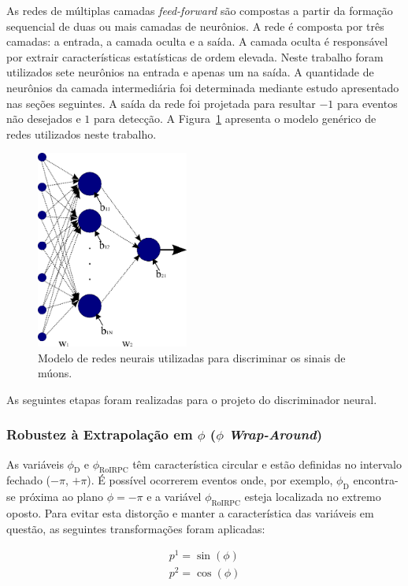 As redes de múltiplas camadas \emph{feed-forward} são compostas a partir da
formação sequencial de duas ou mais camadas de neurônios. A rede é composta por
três camadas: a entrada, a camada oculta e a saída. A camada oculta é
responsável por extrair características estatísticas de ordem elevada. Neste
trabalho foram utilizados sete neurônios na entrada e apenas um na saída. A
quantidade de neurônios da camada intermediária foi determinada mediante estudo
apresentado nas seções seguintes. A saída da rede foi projetada para resultar
$-1$ para eventos não desejados e $1$ para detecção. A Figura~\ref{fig:nnArch}
apresenta o modelo genérico de redes utilizados neste trabalho.

\begin{figure}[htbp!]
    \centering
    \includegraphics[height=6.5cm]{images/nnschema.png}
    \caption{Modelo de redes neurais utilizadas para discriminar os sinais de
    múons.}
    \label{fig:nnArch}
\end{figure}

As seguintes etapas foram realizadas para o projeto do discriminador neural.

\subsubsection{Robustez à Extrapolação em $\phi$ ($\phi$ \emph{Wrap-Around})}

As variáveis $\phi_\text{D}$ e $\phi_{\text{RoIRPC}}$ têm característica circular
e estão definidas no intervalo fechado ($-\pi$, $+\pi$). É possível ocorrerem
eventos onde, por exemplo, $\phi_\text{D}$ encontra-se próxima ao plano $\phi =
-\pi$ e a variável $\phi_{\text{RoIRPC}}$ esteja localizada no extremo oposto.
Para evitar esta distorção e manter a característica das variáveis em questão,
as seguintes transformações foram aplicadas:

\begin{eqnarray}
p^1 = \sin(\phi)\\
p^2 = \cos(\phi)
\end{eqnarray}

